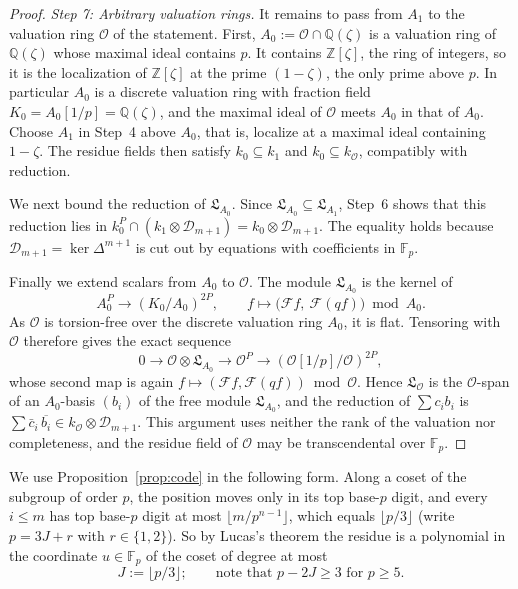 \documentclass[11pt]{amsart}
\numberwithin{equation}{section}
\theoremstyle{plain}
\theoremstyle{definition}
\theoremstyle{remark}
\begin{document}
\begin{proof}
\emph{Step 7: Arbitrary valuation rings.} It remains to pass from \(A_1\) to the valuation ring \(\mathcal O\) of the statement. First, \(A_0:=\mathcal O\cap\mathbb Q(\zeta)\) is a valuation ring of \(\mathbb Q(\zeta)\) whose maximal ideal contains \(p\). It contains \(\mathbb Z[\zeta]\), the ring of integers, so it is the localization of \(\mathbb Z[\zeta]\) at the prime \((1-\zeta)\), the only prime above \(p\). In particular \(A_0\) is a discrete valuation ring with fraction field \(K_0=A_0[1/p]=\mathbb Q(\zeta)\), and the maximal ideal of \(\mathcal O\) meets \(A_0\) in that of \(A_0\). Choose \(A_1\) in Step~4 above \(A_0\), that is, localize at a maximal ideal containing \(1-\zeta\). The residue fields then satisfy \(k_0\subseteq k_1\) and \(k_0\subseteq k_{\mathcal O}\), compatibly with reduction.

We next bound the reduction of \(\mathfrak L_{A_0}\). Since \(\mathfrak L_{A_0}\subseteq\mathfrak L_{A_1}\), Step~6 shows that this reduction lies in \(k_0^P\cap(k_1\otimes\mathcal D_{m+1})=k_0\otimes\mathcal D_{m+1}\). The equality holds because \(\mathcal D_{m+1}=\ker\Delta^{m+1}\) is cut out by equations with coefficients in \(\mathbb F_p\).

Finally we extend scalars from \(A_0\) to \(\mathcal O\). The module \(\mathfrak L_{A_0}\) is the kernel of
\[A_0^P\to(K_0/A_0)^{2P},\qquad f\mapsto\bigl(\mathcal Ff,\ \mathcal F(qf)\bigr)\bmod A_0 .\]
As \(\mathcal O\) is torsion-free over the discrete valuation ring \(A_0\), it is flat. Tensoring with \(\mathcal O\) therefore gives the exact sequence
\[0\to\mathcal O\otimes\mathfrak L_{A_0}\to\mathcal O^P\to(\mathcal O[1/p]/\mathcal O)^{2P},\]
whose second map is again \(f\mapsto(\mathcal Ff,\mathcal F(qf))\bmod\mathcal O\). Hence \(\mathfrak L_{\mathcal O}\) is the \(\mathcal O\)-span of an \(A_0\)-basis \((b_i)\) of the free module \(\mathfrak L_{A_0}\), and the reduction of \(\sum c_ib_i\) is \(\sum\bar c_i\,\overline{b_i}\in k_{\mathcal O}\otimes\mathcal D_{m+1}\). This argument uses neither the rank of the valuation nor completeness, and the residue field of \(\mathcal O\) may be transcendental over \(\mathbb F_p\).
\end{proof}

We use Proposition~\ref{prop:code} in the following form. Along a coset of the subgroup of order \(p\), the position moves only in its top base-\(p\) digit, and every \(i\le m\) has top base-\(p\) digit at most \(\lfloor m/p^{n-1}\rfloor\), which equals \(\lfloor p/3\rfloor\) (write \(p=3J+r\) with \(r\in\{1,2\}\)). So by Lucas's theorem the residue is a polynomial in the coordinate \(u\in\mathbb F_p\) of the coset of degree at most
\[J:=\lfloor p/3\rfloor;\qquad\text{note that }p-2J\ge3\text{ for }p\ge5 .\]
\end{document}
